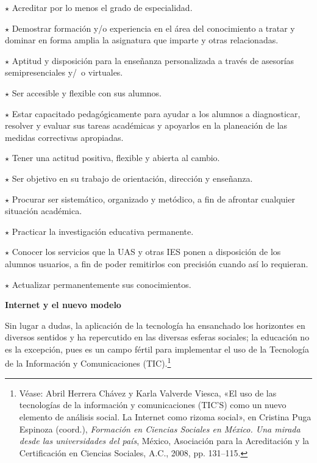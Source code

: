 \begin{Obs}
\item[$\star$] Acreditar por lo menos el grado de especialidad.
\item[$\star$] Demostrar formación y\slash{}o experiencia en el área del conocimiento a tratar y
dominar en forma amplia la asignatura que imparte y otras relacionadas. 
\item[$\star$]  Aptitud y disposición para la enseñanza personalizada a través de
asesorías semipresenciales y\slash\ o virtuales.
\item[$\star$]  Ser accesible y flexible con sus alumnos. 
\item[$\star$]  Estar capacitado pedagógicamente para ayudar a los alumnos a diagnosticar,
resolver y evaluar sus tareas académicas y apoyarlos en la planeación de las
medidas correctivas apropiadas.
\item[$\star$]  Tener una actitud positiva, flexible y abierta al cambio. 
\item[$\star$]  Ser objetivo en su trabajo de orientación, dirección y enseñanza. 
\item[$\star$]  Procurar ser sistemático, organizado y metódico, a fin de afrontar
cualquier situación académica.
\item[$\star$]  Practicar la investigación educativa permanente.
\item[$\star$]  Conocer los servicios que la UAS y otras IES ponen  a disposición de los
alumnos usuarios, a fin de poder remitirlos con precisión cuando así lo
requieran.
\item[$\star$]  Actualizar permanentemente sus conocimientos.
\end{Obs}

\bigskip
{\bfseries Internet y el nuevo modelo}
\enlargethispage{1\baselineskip}

Sin lugar a dudas, la aplicación de la tecnología ha ensanchado los 
horizontes en diversos sentidos y ha repercutido en las diversas esferas 
sociales; la educación no es la excepción, pues es un campo fértil para 
implementar el uso de la Tecnología de la Información y Comunicaciones (TIC).\footnote{Véase:  Abril Herrera Chávez y Karla Valverde Viesca, «El uso de las tecnologías de la información y comunicaciones (TIC’S) como un nuevo elemento de análisis social. La Internet como rizoma social», en Cristina Puga Espinoza (coord.), {\itshape Formación en Ciencias Sociales en México. Una mirada desde las universidades del país}, México, Asociación para la Acreditación y la Certificación en Ciencias Sociales, A.C., 2008, pp. 131--115.}

